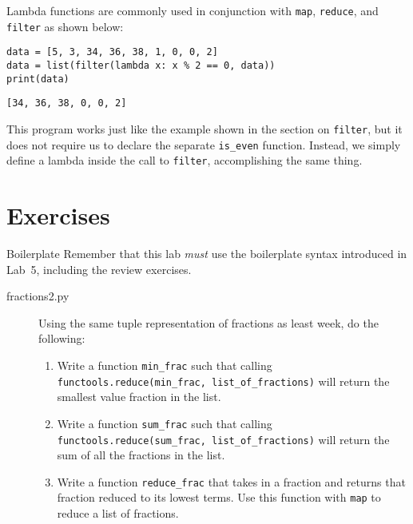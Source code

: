 \documentclass[11pt]{cselabheader}
\begin{document}
Lambda functions are commonly used in conjunction with \lstinline{map}, \lstinline{reduce}, and \lstinline{filter} as shown below:

\begin{lstlisting}[style=python]
data = [5, 3, 34, 36, 38, 1, 0, 0, 2]
data = list(filter(lambda x: x % 2 == 0, data))
print(data)
\end{lstlisting}

\begin{lstlisting}[style=bash]
[34, 36, 38, 0, 0, 2]
\end{lstlisting}

This program works just like the example shown in the section on \lstinline{filter}, but it does not require us to declare the separate \lstinline{is_even} function. Instead, we simply define a lambda inside the call to \lstinline{filter}, accomplishing the same thing.


\pagebreak


\section{Exercises}
\label{sec:ex}

\begin{warningbox}{Boilerplate}
  Remember that this lab \emph{must} use the
  boilerplate syntax introduced in Lab~5, including the review exercises.
\end{warningbox}

\begin{description}
  \item[fractions2.py] Using the same tuple representation of fractions as least
    week, do the following:

    \begin{enumerate}
      \item Write a function \lstinline{min_frac} such that calling
        \lstinline{functools.reduce(min_frac, list_of_fractions)} will return
        the smallest value fraction in the list.
      \item Write a function \lstinline{sum_frac} such that calling
        \lstinline{functools.reduce(sum_frac, list_of_fractions)} will return
        the sum of all the fractions in the list.
      \item Write a function \lstinline{reduce_frac} that takes in a fraction and
        returns that fraction reduced to its lowest terms. Use this function with
        \lstinline{map} to reduce a list of fractions.
    \end{enumerate}
\end{description}
\end{document}
